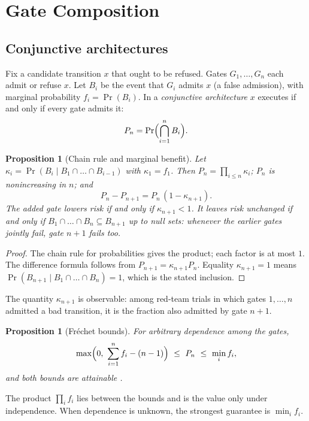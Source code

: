 \documentclass[11pt]{article}
\newtheorem{proposition}[theorem]{Proposition}
\theoremstyle{definition}
\begin{document}
\section{Gate Composition}\label{app:E}

\subsection{Conjunctive architectures}

Fix a candidate transition $x$ that ought to be refused. Gates $G_1,\dots,G_n$ each admit or refuse $x$. Let $B_i$ be the event that $G_i$ admits $x$ (a false admission), with marginal probability $f_i=\Pr(B_i)$. In a \emph{conjunctive architecture} $x$ executes if and only if every gate admits it:
\[
P_n=\Pr\Bigl(\bigcap_{i=1}^nB_i\Bigr).
\]

\begin{proposition}[Chain rule and marginal benefit]\label{prop:E1}
Let $\kappa_i=\Pr(B_i\mid B_1\cap\dots\cap B_{i-1})$ with $\kappa_1=f_1$. Then $P_n=\prod_{i\le n}\kappa_i$; $P_n$ is nonincreasing in $n$; and
\[
P_n-P_{n+1}=P_n\,(1-\kappa_{n+1}).
\]
The added gate lowers risk if and only if $\kappa_{n+1}<1$. It leaves risk unchanged if and only if $B_1\cap\dots\cap B_n\subseteq B_{n+1}$ up to null sets: whenever the earlier gates jointly fail, gate $n+1$ fails too.
\end{proposition}
\begin{proof}
The chain rule for probabilities gives the product; each factor is at most $1$. The difference formula follows from $P_{n+1}=\kappa_{n+1}P_n$. Equality $\kappa_{n+1}=1$ means $\Pr(B_{n+1}\mid B_1\cap\dots\cap B_n)=1$, which is the stated inclusion.
\end{proof}

The quantity $\kappa_{n+1}$ is observable: among red-team trials in which gates $1,\dots,n$ admitted a bad transition, it is the fraction also admitted by gate $n+1$.

\begin{proposition}[Fr\'echet bounds]\label{prop:E2}
For arbitrary dependence among the gates,
\[
\max\Bigl(0,\ \sum_{i=1}^nf_i-(n-1)\Bigr)\ \le\ P_n\ \le\ \min_if_i,
\]
and both bounds are attainable \cite{frechet1951}.
\end{proposition}

The product $\prod_if_i$ lies between the bounds and is the value only under independence. When dependence is unknown, the strongest guarantee is $\min_if_i$.
\end{document}
